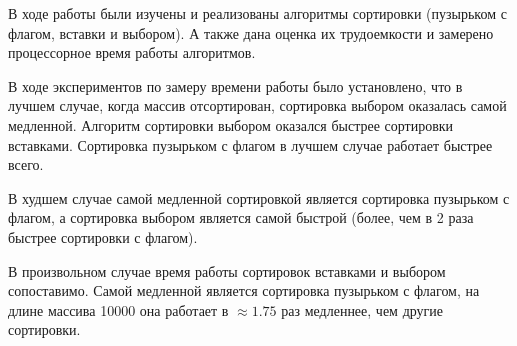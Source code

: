 \Conclusion
    В ходе работы были изучены и реализованы алгоритмы сортировки
    (пузырьком с флагом, вставки и выбором). А также дана оценка их трудоемкости и замерено процессорное время работы алгоритмов.
    
    В ходе экспериментов по замеру времени работы было установлено, что 
    в лучшем случае, когда массив отсортирован, сортировка выбором оказалась самой медленной.
    Алгоритм сортировки выбором оказался быстрее сортировки вставками.
    Сортировка пузырьком с флагом в лучшем случае работает быстрее всего.

    В худшем случае самой медленной сортировкой является сортировка пузырьком с флагом,
    а сортировка выбором является самой быстрой (более, чем в 2 раза быстрее сортировки с флагом).

    В произвольном случае время работы сортировок вставками и выбором сопоставимо.
    Самой медленной является сортировка пузырьком с флагом,
    на длине массива 10000 она работает в $ \approx 1.75 $ раз медленнее,
    чем другие сортировки.
